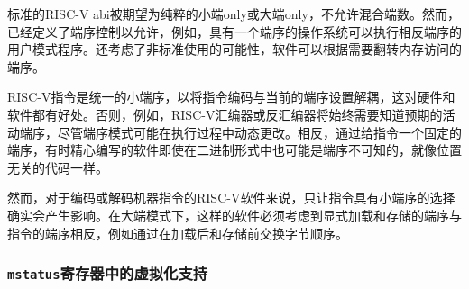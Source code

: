 \begin{commentary}
标准的RISC-V abi被期望为纯粹的小端only或大端only，不允许混合端数。然而，已经定义了端序控制以允许，例如，具有一个端序的操作系统可以执行相反端序的用户模式程序。还考虑了非标准使用的可能性，软件可以根据需要翻转内存访问的端序。
\end{commentary}

\iffalse
\begin{commentary}
RISC-V instructions are uniformly little-endian to decouple instruction
encoding from the current endianness settings, for the benefit of both
hardware and software.
Otherwise, for instance, a RISC-V assembler or disassembler would always
need to know the intended active endianness, despite that the endianness
mode might change dynamically during execution.
In contrast, by giving instructions a fixed endianness, it is sometimes
possible for carefully written software to be endianness-agnostic even in
binary form, much like position-independent code.

The choice to have instructions be only little-endian does have
consequences, however, for RISC-V software that encodes or decodes
machine instructions.
In big-endian mode, such software must account for the fact that explicit
loads and stores have endianness opposite that of instructions, for
example by swapping byte order after loads and before stores.
\end{commentary}
\fi

\begin{commentary}
RISC-V指令是统一的小端序，以将指令编码与当前的端序设置解耦，这对硬件和软件都有好处。否则，例如，RISC-V汇编器或反汇编器将始终需要知道预期的活动端序，尽管端序模式可能在执行过程中动态更改。相反，通过给指令一个固定的端序，有时精心编写的软件即使在二进制形式中也可能是端序不可知的，就像位置无关的代码一样。

然而，对于编码或解码机器指令的RISC-V软件来说，只让指令具有小端序的选择确实会产生影响。在大端模式下，这样的软件必须考虑到显式加载和存储的端序与指令的端序相反，例如通过在加载后和存储前交换字节顺序。
\end{commentary}

\subsubsection{{\tt mstatus}寄存器中的虚拟化支持}
\label{virt-control}

